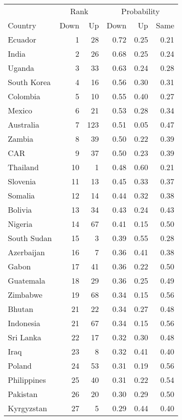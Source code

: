 
\begin{longtable}[t]{lrrrrr}
\toprule
\multicolumn{1}{c}{ } & \multicolumn{2}{c}{Rank} & \multicolumn{3}{c}{Probability} \\
\cmidrule(l{3pt}r{3pt}){2-3} \cmidrule(l{3pt}r{3pt}){4-6}
Country & Down & Up & Down & Up & Same\\
\midrule
Ecuador & 1 & 28 & 0.72 & 0.25 & 0.21\\
India & 2 & 26 & 0.68 & 0.25 & 0.24\\
Uganda & 3 & 33 & 0.63 & 0.24 & 0.28\\
South Korea & 4 & 16 & 0.56 & 0.30 & 0.31\\
Colombia & 5 & 10 & 0.55 & 0.40 & 0.27\\
\addlinespace
Mexico & 6 & 21 & 0.53 & 0.28 & 0.34\\
Australia & 7 & 123 & 0.51 & 0.05 & 0.47\\
Zambia & 8 & 39 & 0.50 & 0.22 & 0.39\\
CAR & 9 & 37 & 0.50 & 0.23 & 0.39\\
Thailand & 10 & 1 & 0.48 & 0.60 & 0.21\\
\addlinespace
Slovenia & 11 & 13 & 0.45 & 0.33 & 0.37\\
Somalia & 12 & 14 & 0.44 & 0.32 & 0.38\\
Bolivia & 13 & 34 & 0.43 & 0.24 & 0.43\\
Nigeria & 14 & 67 & 0.41 & 0.15 & 0.50\\
South Sudan & 15 & 3 & 0.39 & 0.55 & 0.28\\
\addlinespace
Azerbaijan & 16 & 7 & 0.36 & 0.41 & 0.38\\
Gabon & 17 & 41 & 0.36 & 0.22 & 0.50\\
Guatemala & 18 & 29 & 0.36 & 0.25 & 0.49\\
Zimbabwe & 19 & 68 & 0.34 & 0.15 & 0.56\\
Bhutan & 21 & 22 & 0.34 & 0.27 & 0.48\\
\addlinespace
Indonesia & 21 & 67 & 0.34 & 0.15 & 0.56\\
Sri Lanka & 22 & 17 & 0.32 & 0.30 & 0.48\\
Iraq & 23 & 8 & 0.32 & 0.41 & 0.40\\
Poland & 24 & 53 & 0.31 & 0.19 & 0.56\\
Philippines & 25 & 40 & 0.31 & 0.22 & 0.54\\
\addlinespace
Pakistan & 26 & 20 & 0.30 & 0.29 & 0.50\\
Kyrgyzstan & 27 & 5 & 0.29 & 0.44 & 0.40\\

\end{longtable}

